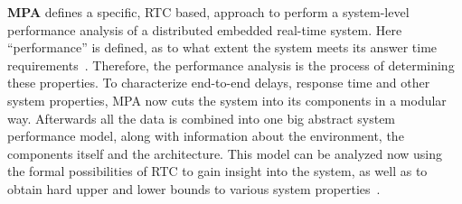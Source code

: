 \textbf{MPA} defines a specific, RTC based, approach to perform a system-level performance analysis of a distributed embedded real-time system.
Here ``performance'' is defined, as to what extent the system meets its answer time requirements~\cite{thi:07}.
Therefore, the performance analysis is the process of determining these properties.
To characterize end-to-end delays, response time and other system properties, MPA now cuts the system into its components in a modular way.
Afterwards all the data is combined into one big abstract system performance model, along with information about the environment, the components itself and the architecture.
This model can be analyzed now using the formal possibilities of RTC to gain insight into the system, as well as to obtain hard upper and lower bounds to various system properties~\cite{wan:05}.